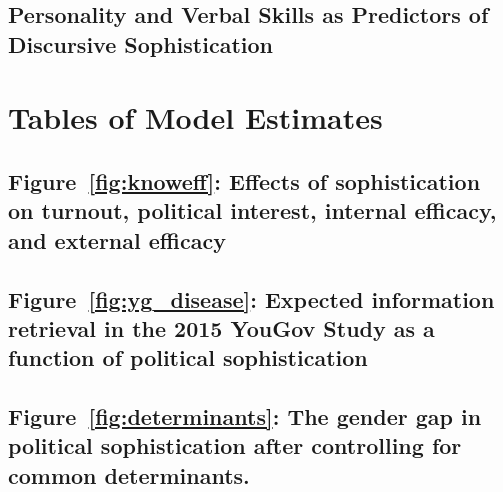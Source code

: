 \clearpage
\subsection{Personality and Verbal Skills as Predictors of Discursive Sophistication}



\clearpage
\section{Tables of Model Estimates}\label{app:tables}

\subsection{Figure~\ref{fig:knoweff}: Effects of sophistication on turnout, political interest, internal efficacy, and external efficacy}




\clearpage

\subsection{Figure~\ref{fig:yg_disease}: Expected information retrieval in the 2015 YouGov Study as a function of political sophistication}

\clearpage

\subsection{Figure~\ref{fig:determinants}: The gender gap in political sophistication after controlling for common determinants.}



